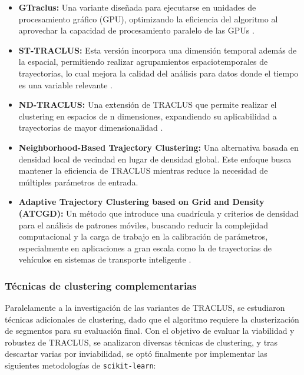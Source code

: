\begin{itemize}
    \item \textbf{GTraclus:} Una variante diseñada para ejecutarse en unidades de procesamiento gráfico (GPU), optimizando la eficiencia del algoritmo al aprovechar la capacidad de procesamiento paralelo de las GPUs \cite{gtraclus}.

    \item \textbf{ST-TRACLUS:} Esta versión incorpora una dimensión temporal además de la espacial, permitiendo realizar agrupamientos espaciotemporales de trayectorias, lo cual mejora la calidad del análisis para datos donde el tiempo es una variable relevante \cite{st-traclus}.

    \item \textbf{ND-TRACLUS:} Una extensión de TRACLUS que permite realizar el clustering en espacios de n dimensiones, expandiendo su aplicabilidad a trayectorias de mayor dimensionalidad \cite{nd-traclus}.

    \item \textbf{Neighborhood-Based Trajectory Clustering:} Una alternativa basada en densidad local de vecindad en lugar de densidad global. Este enfoque busca mantener la eficiencia de TRACLUS mientras reduce la necesidad de múltiples parámetros de entrada.

    \item \textbf{Adaptive Trajectory Clustering based on Grid and Density (ATCGD):} Un método que introduce una cuadrícula y criterios de densidad para el análisis de patrones móviles, buscando reducir la complejidad computacional y la carga de trabajo en la calibración de parámetros, especialmente en aplicaciones a gran escala como la de trayectorias de vehículos en sistemas de transporte inteligente \cite{atcgd}.
\end{itemize}


\subsubsection{Técnicas de clustering complementarias}

Paralelamente a la investigación de las variantes de TRACLUS, se estudiaron técnicas adicionales de clustering, dado que el algoritmo requiere la clusterización de segmentos para su evaluación final. Con el objetivo de evaluar la viabilidad y robustez de TRACLUS, se analizaron diversas técnicas de clustering, y tras descartar varias por inviabilidad, se optó finalmente por implementar las siguientes metodologías de \texttt{scikit-learn}:


